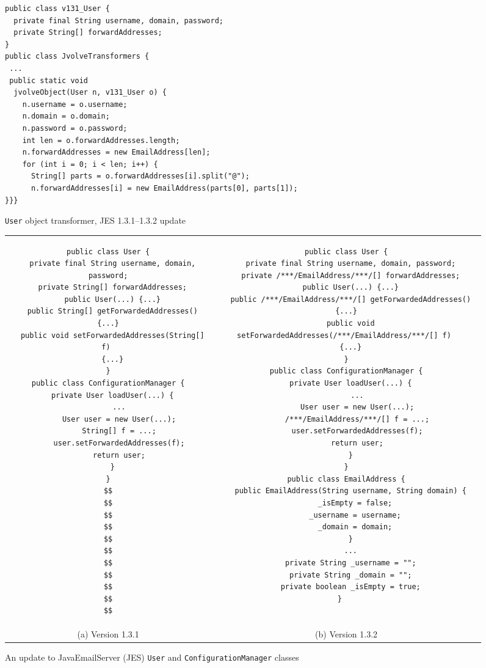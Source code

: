\documentclass[natbib,10pt]{sigplanconf}
\newcommand{\code}[1]{\lstinline|#1|\xspace}
\newcommand{\bh}{}%
\newcommand{\eh}{}%
\begin{document}
\begin{figure}
\begin{lstlisting}
public class v131_User {
  private final String username, domain, password;
  private String[] forwardAddresses;
}
public class JvolveTransformers {
 ...
 public static void
  jvolveObject(User n, v131_User o) {
    n.username = o.username;
    n.domain = o.domain;
    n.password = o.password;
    int len = o.forwardAddresses.length;
    n.forwardAddresses = new EmailAddress[len];
    for (int i = 0; i < len; i++) {
      String[] parts = o.forwardAddresses[i].split("@");
      n.forwardAddresses[i] = new EmailAddress(parts[0], parts[1]);
}}}
\end{lstlisting}
\caption{\code{User} object transformer, JES 1.3.1--1.3.2 update}
\label{fig:example-xform}
\end{figure}

\begin{figure}[t]
\centering
\begin{tabular}{c|c}
\begin{minipage}{2.8in}
\begin{lstlisting}[]
public class User {
  private final String username, domain, password;
  private String[] forwardAddresses;
  public User(...) {...}
  public String[] getForwardedAddresses() {...}
  public void setForwardedAddresses(String[] f) 
  {...}
}
public class ConfigurationManager {
  private User loadUser(...) {
     ...
     User user = new User(...);
     String[] f = ...;
     user.setForwardedAddresses(f);
     return user;
  }
}
$$
$$
$$
$$
$$
$$
$$
$$
$$
$$
$$
\end{lstlisting}
\end{minipage} &
\begin{minipage}{2.8in}
\begin{lstlisting}
public class User {
  private final String username, domain, password;
  private /**\bh*/EmailAddress/**\eh*/[] forwardAddresses;
  public User(...) {...}
  public /**\bh*/EmailAddress/**\eh*/[] getForwardedAddresses() {...}
  public void setForwardedAddresses(/**\bh*/EmailAddress/**\eh*/[] f) 
  {...}
}
public class ConfigurationManager {
  private User loadUser(...) {
     ...
     User user = new User(...);
     /**\bh*/EmailAddress/**\eh*/[] f = ...;
     user.setForwardedAddresses(f);
     return user;
  }
}
public class EmailAddress {
  public EmailAddress(String username, String domain) {
    _isEmpty = false;
    _username = username;
    _domain = domain;
  }
  ...
  private String _username = "";
  private String _domain = "";
  private boolean _isEmpty = true;
}   
\end{lstlisting}
\end{minipage} \\[1em]
(a) Version 1.3.1 &
(b) Version 1.3.2 \\
\end{tabular}
\caption{An update to JavaEmailServer (JES) \code{User} and
  \code{ConfigurationManager} classes}
\label{fig:email-example}
\end{figure}
\end{document}

